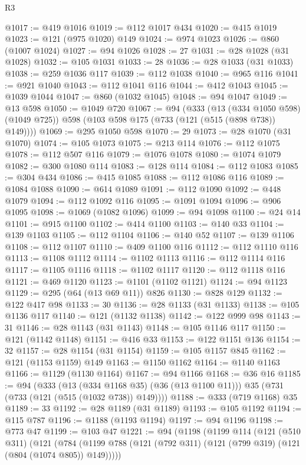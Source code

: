 \begin{lexlean}{R3}
\begin{coremodule}
@1017 := @419 @1016
@1019 := @112 @1017 @434
@1020 := @415 @1019
@1023 := @121 (@975 @1020) @149
@1024 := @974 @1023
@1026 := @860 (@1007 @1024)
@1027 := @94 @1026
@1028 := 27
@1031 := @28 @1028 (@31 @1028)
@1032 := @105 @1031
@1033 := 28
@1036 := @28 @1033 (@31 @1033)
@1038 := @259 @1036 @117
@1039 := @112 @1038
@1040 := @965 @116
@1041 := @921 @1040
@1043 := @112 @1041 @116
@1044 := @412 @1043
@1045 := @1039 @1044
@1047 := @860 (@1032 @1045)
@1048 := @94 @1047
@1049 := @13 @598
@1050 := @1049 @720
@1067 := @94
    (@333
      (@13 (@334 @1050 @598) (@1049 @725))
      @598
      (@103 @598 @175 (@733 (@121 (@515 (@898 @738)) @149))))
@1069 := @295 @1050 @598
@1070 := 29
@1073 := @28 @1070 (@31 @1070)
@1074 := @105 @1073
@1075 := @213 @114
@1076 := @112 @1075
@1078 := @112 @507 @116
@1079 := @1076 @1078
@1080 := @1074 @1079
@1082 := @300 @1080 @114
@1083 := @128 @114
@1084 := @112 @1083
@1085 := @304 @434
@1086 := @415 @1085
@1088 := @112 @1086 @116
@1089 := @1084 @1088
@1090 := @614 @1089
@1091 := @112 @1090
@1092 := @448 @1079
@1094 := @112 @1092 @116
@1095 := @1091 @1094
@1096 := @906 @1095
@1098 := @1069 (@1082 @1096)
@1099 := @94 @1098
@1100 := @24 @14
@1101 := @915 @1100
@1102 := @414 @1100
@1103 := @140 @33
@1104 := @139 @1103
@1105 := @112 @1104
@1106 := @140 @52
@1107 := @139 @1106
@1108 := @112 @1107
@1110 := @409 @1100 @116
@1112 := @112 @1110 @116
@1113 := @1108 @1112
@1114 := @1102 @1113
@1116 := @112 @1114 @116
@1117 := @1105 @1116
@1118 := @1102 @1117
@1120 := @112 @1118 @116
@1121 := @469 @1120
@1123 := @1101 (@1102 @1121)
@1124 := @94 @1123
@1129 := @295 (@64 (@13 @69 @11)) @826
@1130 := @828 @129
@1132 := @122 @417 @98
@1133 := 30
@1136 := @28 @1133 (@31 @1133)
@1138 := @105 @1136 @117
@1140 := @121 (@1132 @1138)
@1142 := @122 @999 @98
@1143 := 31
@1146 := @28 @1143 (@31 @1143)
@1148 := @105 @1146 @117
@1150 := @121 (@1142 @1148)
@1151 := @416 @33
@1153 := @122 @1151 @136
@1154 := 32
@1157 := @28 @1154 (@31 @1154)
@1159 := @105 @1157 @845
@1162 := @121 (@1153 @1159) @149
@1163 := @1150 @1162
@1164 := @1140 @1163
@1166 := @1129 (@1130 @1164)
@1167 := @94 @1166
@1168 := @36 @16
@1185 := @94
    (@333
      (@13 (@334 @1168 @35) (@36 (@13 @1100 @11)))
      @35
      (@731 (@733 (@121 (@515 (@1032 @738)) @149))))
@1188 := @333 (@719 @1168) @35
@1189 := 33
@1192 := @28 @1189 (@31 @1189)
@1193 := @105 @1192
@1194 := @115 @787
@1196 := @1188 (@1193 @1194)
@1197 := @94 @1196
@1198 := @773 @47
@1199 := @103 @47
@1221 := @94
    (@1198
      (@1199
        @114
        (@121
          (@510 @311)
          (@121
            (@784
              (@1199 @788 (@121 (@792 @311) (@121 (@799 @319) (@121 (@804 (@1074 @805)) @149)))))

\end{coremodule}
\end{lexlean}
